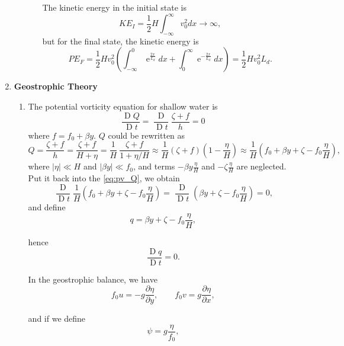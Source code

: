 \documentclass[a4paper]{article}
\begin{document}
\begin{enumerate}[label=\textbf{\arabic*.}]
\begin{enumerate}[label=\textbf{(\alph*)}]
\begin{enumerate}[label=(\roman*)]
			The kinetic energy in the initial state is 
			$$KE_I = \frac{1}{2}H \int_{-\infty}^{\infty}v_0^2dx \longrightarrow \infty,$$
			but for the final state, the kinetic energy is
			$$PE_F = \frac{1}{2}Hv_0^2 \left(\int_{-\infty}^{0}\operatorname{e}^{\frac{2x}{L_d}} dx +\int_{0}^{\infty}\operatorname{e}^{-\frac{2x}{L_d}}dx \right)=\frac{1}{2}Hv_0^2L_d.$$
			\end{enumerate}	
	\end{enumerate}	

\item \textbf{Geostrophic Theory}
	\begin{enumerate}[label=\textbf{(\alph*)}]
	\setcounter{enumii}{0}
	\item The potential vorticity equation for shallow water is
	\begin{equation}\label{eq:pv_Q}
	\frac{\operatorname{D}Q }{\operatorname{D}t} = \frac{\operatorname{D} }{\operatorname{D}t}\frac{\zeta+f}{h}=0
	\end{equation}
	where $f=f_0+\beta y$. $Q$ could be rewritten as
	$$Q=\frac{\zeta+f}{h}=\frac{\zeta+f}{H+\eta} = \frac{1}{H}~\frac{\zeta+f}{1+\eta/H}\approx\frac{1}{H}(\zeta+f)\left(1-\frac{\eta}{H}\right)\approx\frac{1}{H}\left(f_0+\beta y+\zeta -f_0\frac{\eta}{H}\right), $$
	where $|\eta| \ll H$ and $|\beta y|\ll f_0$, and terms $-\beta y\frac{\eta}{H} $ and $-\zeta \frac{\eta}{H} $ are neglected. Put it back into the \eqref{eq:pv_Q}, we obtain
	$$\frac{\operatorname{D} }{\operatorname{D}t} \frac{1}{H}\left(f_0+\beta y+\zeta -f_0\frac{\eta}{H}\right) =\frac{\operatorname{D} }{\operatorname{D}t} \left(\beta y+\zeta -f_0\frac{\eta}{H}\right) = 0,$$
	and define 
	\begin{equation}\label{eq:q_pv}
			q=\beta y+\zeta -f_0\frac{\eta}{H},
	\end{equation}

	hence 
	\begin{equation}\label{eq:q_conserv}
		\frac{\operatorname{D}q}{\operatorname{D}t} =0.
	\end{equation}
	
	In the geostrophic balance, we have
	$$f_0 u = -g\frac{\partial \eta}{\partial y},\qquad f_0 v = g\frac{\partial \eta}{\partial x},$$
	
	and if we define 
	\begin{equation}\label{eq:psi_eta}
	\psi = g\frac{\eta}{f_0},
	\end{equation}
	

\end{enumerate}
\end{enumerate}
\end{document}
